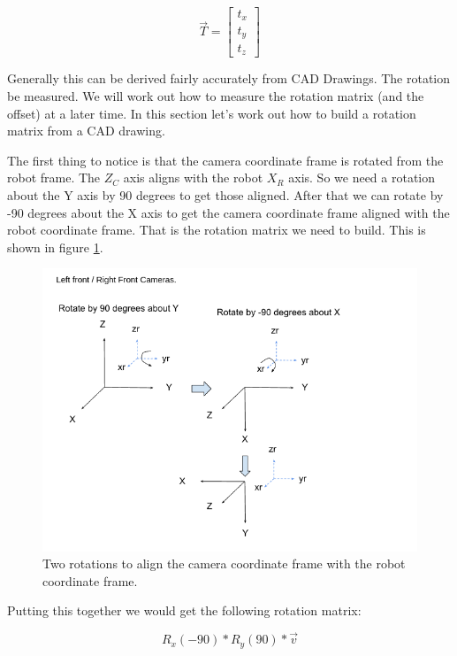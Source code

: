 \documentclass[11pt]{article}
\begin{document}
\begin{equation}
    \vec{T} = \begin{bmatrix}
        t_x \\
        t_y \\
        t_z
    \end{bmatrix}
\end{equation}

Generally this can be derived fairly accurately from CAD Drawings.  The rotation be measured.
We will work out how to measure the rotation matrix (and the offset) at a later time.  In this 
section let's work out how to build a rotation matrix from a CAD drawing.

The first thing to notice is that the camera coordinate frame is rotated from the robot
frame.  The $Z_C$ axis aligns with the robot $X_R$ axis.  So we need a rotation
about the Y axis by 90 degrees to get those aligned. After that we can rotate
by -90 degrees about the X axis to get the camera coordinate frame aligned with
the robot coordinate frame.  That is the rotation matrix we need to build.
This is shown in figure \ref{fig:rotations1}.

\begin{figure}[h!]
    \centering
    \includegraphics[scale=0.5]{figures/rotations1.png}
    \caption{Two rotations to align the camera coordinate frame with the robot coordinate frame.}
    \label{fig:rotations1}
\end{figure}

Putting this together we would get the following rotation matrix:

\begin{equation}
    R_x(-90) * R_y(90) * \vec{v}
\end{equation}
\end{document}
